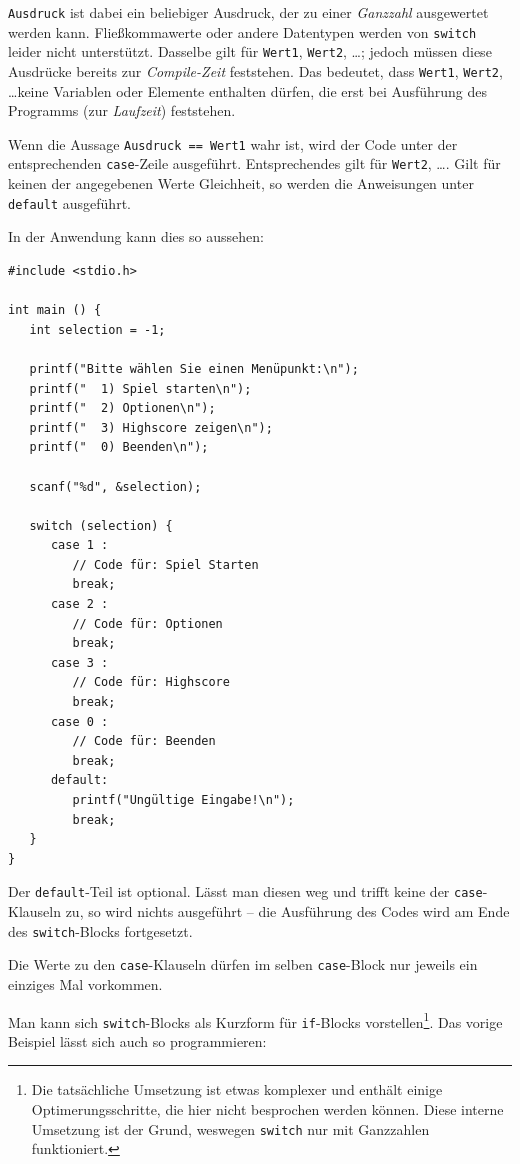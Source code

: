 \texttt{Ausdruck} ist dabei ein beliebiger Ausdruck, der zu einer \emph{Ganzzahl} ausgewertet werden kann. Fließkommawerte oder andere Datentypen werden von \texttt{switch} leider nicht unterstützt. Dasselbe gilt für \texttt{Wert1}, \texttt{Wert2}, \ldots; jedoch müssen diese Ausdrücke bereits zur \emph{Compile-Zeit} feststehen. Das bedeutet, dass \texttt{Wert1}, \texttt{Wert2}, \ldots keine Variablen oder Elemente enthalten dürfen, die erst bei Ausführung des Programms (zur \emph{Laufzeit}) feststehen.

Wenn die Aussage \texttt{Ausdruck == Wert1} wahr ist, wird der Code unter der entsprechenden \texttt{case}-Zeile ausgeführt. Entsprechendes gilt für \texttt{Wert2}, \ldots. Gilt für keinen der angegebenen Werte Gleichheit, so werden die Anweisungen unter \texttt{default} ausgeführt.

In der Anwendung kann dies so aussehen:

\begin{codebox}
\begin{verbatim}
#include <stdio.h>

int main () {
   int selection = -1;
   
   printf("Bitte wählen Sie einen Menüpunkt:\n");
   printf("  1) Spiel starten\n");
   printf("  2) Optionen\n");
   printf("  3) Highscore zeigen\n");
   printf("  0) Beenden\n");
   
   scanf("%d", &selection);
   
   switch (selection) {
      case 1 :
         // Code für: Spiel Starten
         break;
      case 2 :
         // Code für: Optionen
         break;
      case 3 :
         // Code für: Highscore
         break;
      case 0 :
         // Code für: Beenden
         break;      
      default:
         printf("Ungültige Eingabe!\n");
         break;
   }
}
\end{verbatim}
\end{codebox}

Der \texttt{default}-Teil ist optional. Lässt man diesen weg und trifft keine der \texttt{case}-Klauseln zu, so wird nichts ausgeführt -- die Ausführung des Codes wird am Ende des \texttt{switch}-Blocks fortgesetzt.

Die Werte zu den \texttt{case}-Klauseln dürfen im selben \texttt{case}-Block nur jeweils ein einziges Mal vorkommen.

Man kann sich \texttt{switch}-Blocks als Kurzform für \texttt{if}-Blocks vorstellen\footnote{Die tatsächliche Umsetzung ist etwas komplexer und enthält einige Optimerungsschritte, die hier nicht besprochen werden können. Diese interne Umsetzung ist der Grund, weswegen \texttt{switch} nur mit Ganzzahlen funktioniert.}. Das vorige Beispiel lässt sich auch so programmieren:

